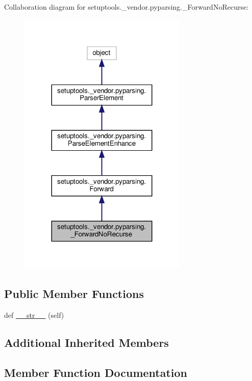 Collaboration diagram for setuptools.\+\_\+vendor.\+pyparsing.\+\_\+\+Forward\+No\+Recurse\+:
\nopagebreak
\begin{figure}[H]
\begin{center}
\leavevmode
\includegraphics[width=227pt]{classsetuptools_1_1__vendor_1_1pyparsing_1_1__ForwardNoRecurse__coll__graph}
\end{center}
\end{figure}
\subsection*{Public Member Functions}
\begin{DoxyCompactItemize}
\item 
def \hyperlink{classsetuptools_1_1__vendor_1_1pyparsing_1_1__ForwardNoRecurse_ad1f9ffd161fff4f8fa5e81a396967f5b}{\+\_\+\+\_\+str\+\_\+\+\_\+} (self)
\end{DoxyCompactItemize}
\subsection*{Additional Inherited Members}


\subsection{Member Function Documentation}
\mbox{\label{classsetuptools_1_1__vendor_1_1pyparsing_1_1__ForwardNoRecurse_ad1f9ffd161fff4f8fa5e81a396967f5b}} 
